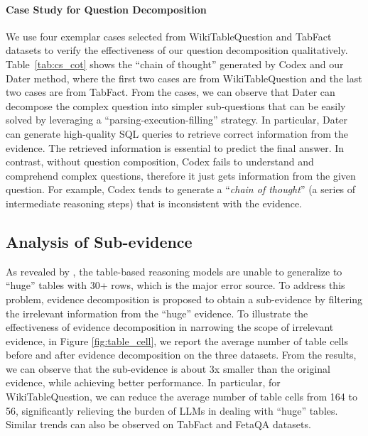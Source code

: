 \documentclass{article}
\begin{document}
\paragraph{Case Study for Question Decomposition}
We use four exemplar cases selected from WikiTableQuestion and TabFact datasets to verify the effectiveness of our question decomposition qualitatively.
Table~\ref{tab:cs_cot} shows the ``chain of thought'' generated by Codex and our Dater method, where the first two cases are from WikiTableQuestion and the last two cases are from TabFact. From the cases, we can observe that Dater can decompose the complex question into simpler sub-questions that can be easily solved by leveraging a ``parsing-execution-filling'' strategy. In particular, Dater can generate high-quality SQL queries to retrieve correct information from the evidence. The retrieved information is essential to predict the final answer.  In contrast, without question composition, Codex fails to understand and comprehend complex questions, therefore it just gets information from the given question. For example, Codex tends to generate a ``\textit{chain of thought}'' (a series of intermediate reasoning steps) that is inconsistent with the evidence. 





\subsection{Analysis of Sub-evidence}
As revealed by \citep{llmtab}, the table-based reasoning models are unable to generalize to ``huge'' tables with 30+ rows, which is the major error source. To address this problem, evidence decomposition is proposed to obtain a sub-evidence by filtering the irrelevant information from the ``huge'' evidence. To illustrate the effectiveness of evidence decomposition in narrowing the scope of irrelevant evidence, in Figure \ref{fig:table_cell}, we report the average number of table cells before and after evidence decomposition on the three datasets. From the results, we can observe that the sub-evidence is about 3x smaller than the original evidence, while achieving better performance. In particular, for WikiTableQuestion, we can reduce the average number of table cells from 164 to 56, significantly relieving the burden of LLMs in dealing with ``huge'' tables. Similar trends can also be observed on TabFact and FetaQA datasets. 
\end{document}

